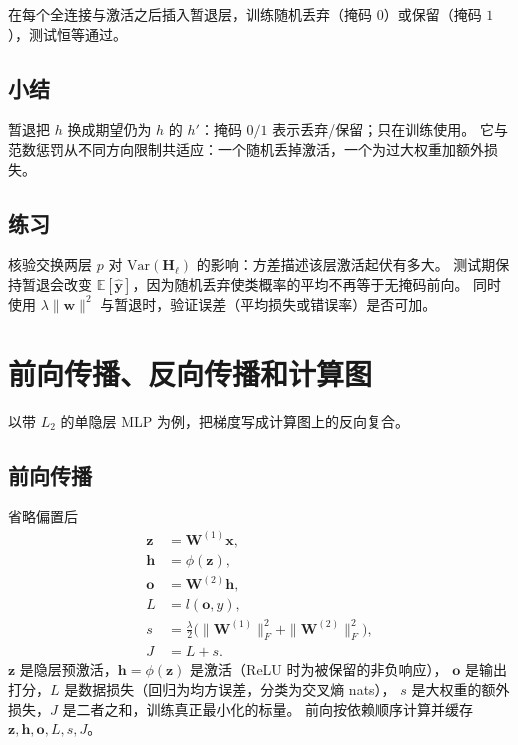 在每个全连接与激活之后插入暂退层，训练随机丢弃（掩码 $0$）或保留（掩码 $1$），测试恒等通过。

\subsection{小结}

暂退把 $h$ 换成期望仍为 $h$ 的 $h'$：掩码 $0/1$ 表示丢弃/保留；只在训练使用。
它与范数惩罚从不同方向限制共适应：一个随机丢掉激活，一个为过大权重加额外损失。

\subsection{练习}

核验交换两层 $p$ 对 $\mathrm{Var}(\bm{H}_{\ell})$ 的影响：方差描述该层激活起伏有多大。
测试期保持暂退会改变 $\mathbb{E}[\hat{\bm{y}}]$，因为随机丢弃使类概率的平均不再等于无掩码前向。
同时使用 $\lambda\|\bm{w}\|^{2}$ 与暂退时，验证误差（平均损失或错误率）是否可加。

\section{前向传播、反向传播和计算图}



以带 $L_{2}$ 的单隐层 MLP 为例，把梯度写成计算图上的反向复合。

\subsection{前向传播}

省略偏置后
\begin{align*}
\bm{z}&=\bm{W}^{(1)}\bm{x},\\
\bm{h}&=\phi(\bm{z}),\\
\bm{o}&=\bm{W}^{(2)}\bm{h},\\
L&=l(\bm{o},y),\\
s&=\frac{\lambda}{2}\bigl(\|\bm{W}^{(1)}\|_{F}^{2}+\|\bm{W}^{(2)}\|_{F}^{2}\bigr),\\
J&=L+s.
\end{align*}
$\bm{z}$ 是隐层预激活，$\bm{h}=\phi(\bm{z})$ 是激活（ReLU 时为被保留的非负响应），
$\bm{o}$ 是输出打分，$L$ 是数据损失（回归为均方误差，分类为交叉熵 nats），
$s$ 是大权重的额外损失，$J$ 是二者之和，训练真正最小化的标量。
前向按依赖顺序计算并缓存 $\bm{z},\bm{h},\bm{o},L,s,J$。


